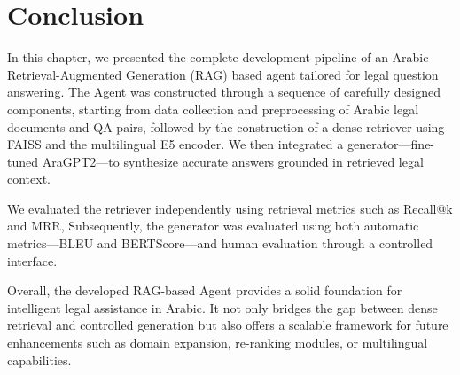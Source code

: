 \newpage
\section{Conclusion}
In this chapter, we presented the complete development pipeline of an Arabic Retrieval-Augmented Generation (RAG) based agent tailored for legal question answering. The Agent was constructed through a sequence of carefully designed components, starting from data collection and preprocessing of Arabic legal documents and QA pairs, followed by the construction of a dense retriever using FAISS and the multilingual E5 encoder. We then integrated a generator—fine-tuned AraGPT2—to synthesize accurate answers grounded in retrieved legal context.

We evaluated the retriever independently using retrieval metrics such as Recall@k and MRR,  Subsequently, the generator was evaluated using both automatic metrics—BLEU and BERTScore—and human evaluation through a controlled interface.

Overall, the developed RAG-based Agent provides a solid foundation for intelligent legal assistance in Arabic. It not only bridges the gap between dense retrieval and controlled generation but also offers a scalable framework for future enhancements such as domain expansion, re-ranking modules, or multilingual capabilities.





